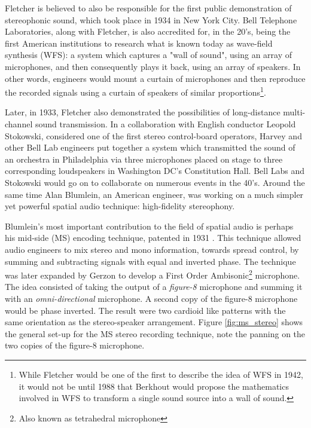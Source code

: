 Fletcher is believed to also be responsible for the first public demonstration of stereophonic sound, which took place in 1934 in New York City. Bell Telephone Laboratories, along with Fletcher, is also accredited for, in the 20's, being the first American institutions to research what is known today as wave-field synthesis (WFS): a system which captures a "wall of sound", using an array of microphones, and then consequently plays it back, using an array of speakers. In other words, engineers would mount a curtain of microphones and then reproduce the recorded signals using a curtain of speakers of similar proportions\cite{fletcher1942hearing}\footnote{While Fletcher would be one of the first to describe the idea of WFS in 1942, it would not be until 1988 that Berkhout would propose the mathematics involved in WFS to transform a single sound source into a wall of sound.}.

Later, in 1933, Fletcher also demonstrated the possibilities of long-distance multi-channel sound transmission. In a collaboration with English conductor Leopold Stokowski, considered one of the first stereo control-board operators\cite{mcginn1983stokowski}, Harvey and other Bell Lab engineers put together a system which transmitted the sound of an orchestra in Philadelphia via three microphones placed on stage to three corresponding loudspeakers in Washington DC's Constitution Hall. Bell Labs and Stokowski would go on to collaborate on numerous events in the 40's. Around the same time Alan Blumlein, an American engineer, was working on a much simpler yet powerful spatial audio technique: high-fidelity stereophony. 

Blumlein's most important contribution to the field of spatial audio is perhaps his mid-side (MS) encoding technique, patented in 1931 \cite{billingsley1987simulated}. This technique allowed audio engineers to mix stereo and mono information,  towards spread control, by summing and subtracting signals with equal and inverted phase. The technique was later expanded by Gerzon to develop a First Order Ambisonic\footnote{Also known as tetrahedral microphone} microphone. The idea consisted of taking the output of a \textit{figure-8} microphone and summing it with an \textit{omni-directional} microphone. A second copy of the figure-8 microphone would be phase inverted. The result were two cardioid like patterns with the same orientation as the stereo-speaker arrangement. Figure \ref{fig:ms_stereo} shows the general set-up for the MS stereo recording technique, note the panning on the two copies of the figure-8 microphone. 

